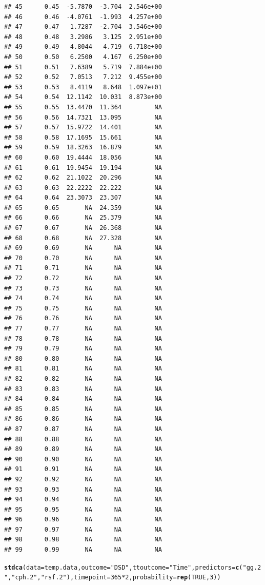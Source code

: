 \documentclass{article}\usepackage[]{graphicx}\usepackage[]{color}
\makeatletter
\newcommand{\hlnum}[1]{\textcolor[rgb]{0.686,0.059,0.569}{#1}}%
\newcommand{\hlstr}[1]{\textcolor[rgb]{0.192,0.494,0.8}{#1}}%
\newcommand{\hlopt}[1]{\textcolor[rgb]{0,0,0}{#1}}%
\newcommand{\hlstd}[1]{\textcolor[rgb]{0.345,0.345,0.345}{#1}}%
\newcommand{\hlkwc}[1]{\textcolor[rgb]{0.333,0.667,0.333}{#1}}%
\newcommand{\hlkwd}[1]{\textcolor[rgb]{0.737,0.353,0.396}{\textbf{#1}}}%
\newenvironment{kframe}{%
 \def\at@end@of@kframe{}%
 \ifinner\ifhmode%
  \def\at@end@of@kframe{\end{minipage}}%
  \begin{minipage}{\columnwidth}%
 \fi\fi%
 \def\FrameCommand##1{\hskip\@totalleftmargin \hskip-\fboxsep
 \colorbox{shadecolor}{##1}\hskip-\fboxsep
     \hskip-\linewidth \hskip-\@totalleftmargin \hskip\columnwidth}%
 \MakeFramed {\advance\hsize-\width
   \@totalleftmargin\z@ \linewidth\hsize
   \@setminipage}}%
 {\par\unskip\endMakeFramed%
 \at@end@of@kframe}
\newenvironment{knitrout}{}{} %
\makeatother
\begin{document}
\begin{knitrout}
\begin{kframe}
\begin{verbatim}
## 45      0.45  -5.7870  -3.704  2.546e+00
## 46      0.46  -4.0761  -1.993  4.257e+00
## 47      0.47   1.7287  -2.704  3.546e+00
## 48      0.48   3.2986   3.125  2.951e+00
## 49      0.49   4.8044   4.719  6.718e+00
## 50      0.50   6.2500   4.167  6.250e+00
## 51      0.51   7.6389   5.719  7.884e+00
## 52      0.52   7.0513   7.212  9.455e+00
## 53      0.53   8.4119   8.648  1.097e+01
## 54      0.54  12.1142  10.031  8.873e+00
## 55      0.55  13.4470  11.364         NA
## 56      0.56  14.7321  13.095         NA
## 57      0.57  15.9722  14.401         NA
## 58      0.58  17.1695  15.661         NA
## 59      0.59  18.3263  16.879         NA
## 60      0.60  19.4444  18.056         NA
## 61      0.61  19.9454  19.194         NA
## 62      0.62  21.1022  20.296         NA
## 63      0.63  22.2222  22.222         NA
## 64      0.64  23.3073  23.307         NA
## 65      0.65       NA  24.359         NA
## 66      0.66       NA  25.379         NA
## 67      0.67       NA  26.368         NA
## 68      0.68       NA  27.328         NA
## 69      0.69       NA      NA         NA
## 70      0.70       NA      NA         NA
## 71      0.71       NA      NA         NA
## 72      0.72       NA      NA         NA
## 73      0.73       NA      NA         NA
## 74      0.74       NA      NA         NA
## 75      0.75       NA      NA         NA
## 76      0.76       NA      NA         NA
## 77      0.77       NA      NA         NA
## 78      0.78       NA      NA         NA
## 79      0.79       NA      NA         NA
## 80      0.80       NA      NA         NA
## 81      0.81       NA      NA         NA
## 82      0.82       NA      NA         NA
## 83      0.83       NA      NA         NA
## 84      0.84       NA      NA         NA
## 85      0.85       NA      NA         NA
## 86      0.86       NA      NA         NA
## 87      0.87       NA      NA         NA
## 88      0.88       NA      NA         NA
## 89      0.89       NA      NA         NA
## 90      0.90       NA      NA         NA
## 91      0.91       NA      NA         NA
## 92      0.92       NA      NA         NA
## 93      0.93       NA      NA         NA
## 94      0.94       NA      NA         NA
## 95      0.95       NA      NA         NA
## 96      0.96       NA      NA         NA
## 97      0.97       NA      NA         NA
## 98      0.98       NA      NA         NA
## 99      0.99       NA      NA         NA
\end{verbatim}
\begin{alltt}
\hlkwd{stdca}\hlstd{(}\hlkwc{data} \hlstd{= temp.data,} \hlkwc{outcome} \hlstd{=} \hlstr{"DSD"}\hlstd{,} \hlkwc{ttoutcome} \hlstd{=} \hlstr{"Time"}\hlstd{,} \hlkwc{predictors} \hlstd{=} \hlkwd{c}\hlstd{(}\hlstr{"gg.2"}\hlstd{,} \hlstr{"cph.2"}\hlstd{,} \hlstr{"rsf.2"}\hlstd{),} \hlkwc{timepoint} \hlstd{=} \hlnum{365}\hlopt{*}\hlnum{2}\hlstd{,} \hlkwc{probability} \hlstd{=} \hlkwd{rep}\hlstd{(}\hlnum{TRUE}\hlstd{,} \hlnum{3}\hlstd{))}

\end{alltt}
\end{kframe}
\end{knitrout}
\end{document}
